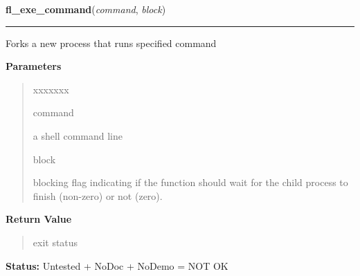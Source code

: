 \hspace{.8\funcindent}\begin{boxedminipage}{\funcwidth}

    \raggedright \textbf{fl\_exe\_command}(\textit{command}, \textit{block})

    \vspace{-1.5ex}

    \rule{\textwidth}{0.5\fboxrule}
\setlength{\parskip}{2ex}
    Forks a new process that runs specified command

\setlength{\parskip}{1ex}
      \textbf{Parameters}
      \vspace{-1ex}

      \begin{quote}
        \begin{Ventry}{xxxxxxx}

          \item[command]

          a shell command line

          \item[block]

          blocking flag indicating if the function should wait for the 
          child process to finish (non-zero) or not (zero).

        \end{Ventry}

      \end{quote}

      \textbf{Return Value}
    \vspace{-1ex}

      \begin{quote}
      exit status

      \end{quote}

\textbf{Status:} Untested + NoDoc + NoDemo = NOT OK



    \end{boxedminipage}

    \label{xformslib:library:fl_exe_command}

    \vspace{0.5ex}

